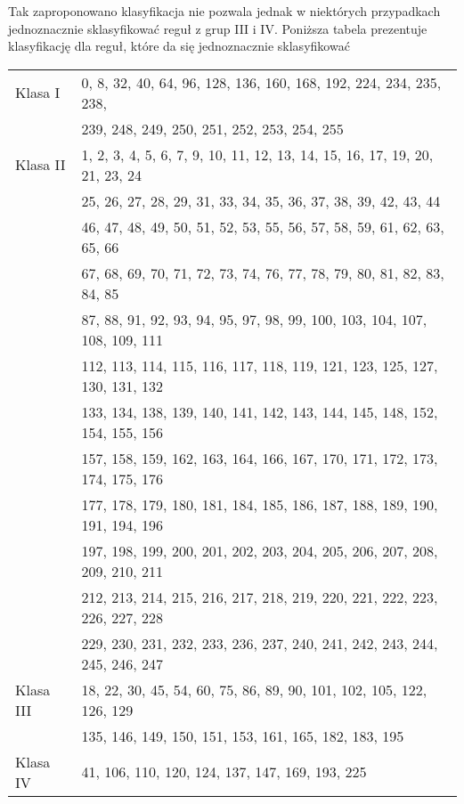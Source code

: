 \documentclass{xmgr}
\begin{document}
Tak zaproponowano klasyfikacja nie pozwala jednak w niektórych przypadkach jednoznacznie sklasyfikować reguł z grup III i IV. Poniższa tabela prezentuje
klasyfikację dla reguł, które da się jednoznacznie sklasyfikować
\begin{center}
    \begin{tabular}{| l | l |}
    \hline
    Klasa I & 0, 8, 32, 40, 64, 96, 128, 136, 160, 168, 192, 224, 234, 235, 238, \\
	    &  239, 248, 249, 250, 251, 252, 253, 254, 255 \\ \hline
    Klasa II & 1, 2, 3, 4, 5, 6, 7, 9, 10, 11, 12, 13, 14, 15, 16, 17, 19, 20, 21, 23, 24 \\
	    &25, 26, 27, 28, 29, 31, 33, 34, 35, 36, 37, 38, 39, 42, 43, 44 \\
	    &46, 47, 48, 49, 50, 51, 52, 53, 55, 56, 57, 58, 59, 61, 62, 63, 65, 66 \\
          &67, 68, 69, 70, 71, 72, 73, 74, 76, 77, 78, 79, 80, 81, 82, 83, 84, 85 \\
          &87, 88, 91, 92, 93, 94, 95, 97, 98, 99, 100, 103, 104, 107, 108, 109, 111 \\
          &112, 113, 114, 115, 116, 117, 118, 119, 121, 123, 125, 127, 130, 131, 132 \\
          &133, 134, 138, 139, 140, 141, 142, 143, 144, 145, 148, 152, 154, 155, 156\\
          &157, 158, 159, 162, 163, 164, 166, 167, 170, 171, 172, 173, 174, 175, 176 \\
          &177, 178, 179, 180, 181, 184, 185, 186, 187, 188, 189, 190, 191, 194, 196 \\
          &197, 198, 199, 200, 201, 202, 203, 204, 205, 206, 207, 208, 209, 210, 211 \\
          &212, 213, 214, 215, 216, 217, 218, 219, 220, 221, 222, 223, 226, 227, 228 \\
          &229, 230, 231, 232, 233, 236, 237, 240, 241, 242, 243, 244, 245, 246, 247 \\ \hline
    Klasa III & 18, 22, 30, 45, 54, 60, 75, 86, 89, 90, 101, 102, 105, 122, 126, 129 \\
          & 135, 146, 149, 150, 151, 153, 161, 165, 182, 183, 195 \\ \hline
    Klasa IV & 41, 106, 110, 120, 124, 137, 147, 169, 193, 225 \\ \hline
    \end{tabular}
\end{center}
\end{document}
